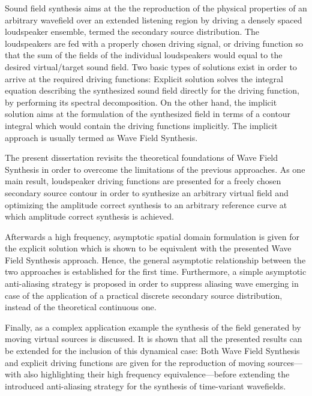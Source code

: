 Sound field synthesis aims at the the reproduction of the physical properties of an arbitrary wavefield over an extended listening region by driving a densely spaced loudspeaker ensemble, termed the secondary source distribution.
The loudspeakers are fed with a properly chosen driving signal, or driving function so that the sum of the fields of the individual loudspeakers would equal to the desired virtual/target sound field.
Two basic types of solutions exist in order to arrive at the required driving functions:
Explicit solution solves the integral equation describing the synthesized sound field directly for the driving function, by performing its spectral decomposition.
On the other hand, the implicit solution aims at the formulation of the synthesized field in terms of a contour integral which would contain the driving functions implicitly.
The implicit approach is usually termed as Wave Field Synthesis.

The present dissertation revisits the theoretical foundations of Wave Field Synthesis in order to overcome the limitations of the previous approaches.
As one main result, loudspeaker driving functions are presented for a freely chosen secondary source contour in order to synthesize an arbitrary virtual field and optimizing the amplitude correct synthesis to an arbitrary reference curve at which amplitude correct synthesis is achieved.

Afterwards a high frequency, asymptotic spatial domain formulation is given for the explicit solution which is shown to be equivalent with the presented Wave Field Synthesis approach.
Hence, the general asymptotic relationship between the two approaches is established for the first time.
Furthermore, a simple asymptotic anti-aliasing strategy is proposed in order to suppress aliasing wave emerging in case of the application of a practical discrete secondary source distribution, instead of the theoretical continuous one.

Finally, as a complex application example the synthesis of the field generated by moving virtual sources is discussed.
It is shown that all the presented results can be extended for the inclusion of this dynamical case: 
Both Wave Field Synthesis and explicit driving functions are given for the reproduction of moving sources---with also highlighting their high frequency equivalence---before extending the introduced anti-aliasing strategy for the synthesis of time-variant wavefields.